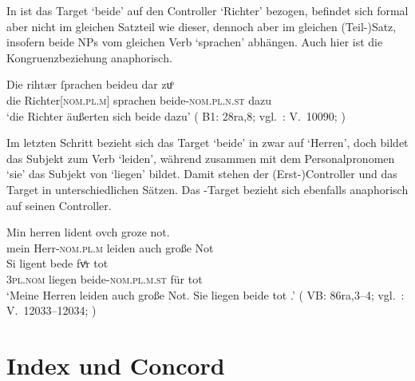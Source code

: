 In  ist das Target  `beide' auf den
Controller  `Richter' bezogen, befindet sich formal aber nicht im
gleichen Satzteil wie dieser, dennoch aber im gleichen (Teil-)Satz, insofern
beide NPs vom gleichen Verb  `sprachen' abhängen. Auch hier ist
die Kongruenzbeziehung anaphorisch.

\begin{exe}
\ex \label{ex:beidedomains_3}
	\gll Die rihtær ſprachen beideu {dar zuͦ} \\
		die Richter[\textsc{nom.pl.m}] sprachen beide-\textsc{nom.pl.n.st}
			dazu \\
	\trans `die Richter äußerten sich beide dazu'
		(%
			B1: 28ra,8;
			vgl.~\KC: V.~10090; \cite[267]{schroeder1895}%
		)
\end{exe}

Im letzten Schritt bezieht sich das Target  `beide' in
 zwar auf  `Herren', doch bildet
 das Subjekt zum Verb  `leiden', während
 zusammen mit dem Personalpronomen  `sie' das
Subjekt von  `liegen' bildet. Damit stehen der (Erst-)Controller
 und das Target  in unterschiedlichen Sätzen. Das
-Target bezieht sich ebenfalls anaphorisch auf seinen Controller.

\begin{exe}
	\ex \label{ex:beidedomains_4}
		\gll Min herren lident ovch groze not. \\
			mein Herr-\textsc{nom.pl.m} leiden auch große Not \\
	\sn \gll Si ligent bede fvͤr tot \\
			\textsc{3pl\subM.nom} liegen beide-\textsc{nom.pl.m.st} für tot \\
	\trans `Meine Herren leiden auch große Not. Sie liegen beide tot
		.'
		(%
			VB: 86ra,3--4;
			vgl.~\KC: V.~12033--12034; \cite[301]{schroeder1895}%
		)		
\end{exe}

\section{Index und Concord}
\label{sec:indexconcord}

